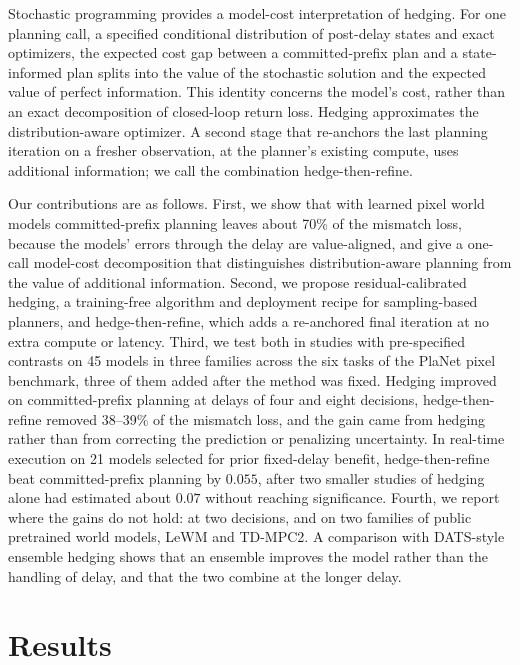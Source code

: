 \documentclass[aps,physrev,\manuscriptlayout,superscriptaddress,
  longbibliography,amsmath,amssymb]{revtex4-2}
\newcounter{algorithm}
\begin{document}
Stochastic programming provides a model-cost interpretation of hedging. For one planning call, a specified conditional distribution of post-delay states and exact optimizers, the expected cost gap between a committed-prefix plan and a state-informed plan splits into the value of the stochastic solution and the expected value of perfect information\cite{birge2011stochastic}. This identity concerns the model's cost, rather than an exact decomposition of closed-loop return loss. Hedging approximates the distribution-aware optimizer. A second stage that re-anchors the last planning iteration on a fresher observation, at the planner's existing compute, uses additional information; we call the combination hedge-then-refine.

Our contributions are as follows. First, we show that with learned pixel world models committed-prefix planning leaves about 70\% of the mismatch loss, because the models' errors through the delay are value-aligned, and give a one-call model-cost decomposition that distinguishes distribution-aware planning from the value of additional information. Second, we propose residual-calibrated hedging, a training-free algorithm and deployment recipe for sampling-based planners, and hedge-then-refine, which adds a re-anchored final iteration at no extra compute or latency. Third, we test both in studies with pre-specified contrasts on 45 models in three families across the six tasks of the PlaNet pixel benchmark, three of them added after the method was fixed. Hedging improved on committed-prefix planning at delays of four and eight decisions, hedge-then-refine removed 38--39\% of the mismatch loss, and the gain came from hedging rather than from correcting the prediction or penalizing uncertainty. In real-time execution on 21 models selected for prior fixed-delay benefit, hedge-then-refine beat committed-prefix planning by $0.055$, after two smaller studies of hedging alone had estimated about $0.07$ without reaching significance. Fourth, we report where the gains do not hold: at two decisions, and on two families of public pretrained world models, LeWM and TD-MPC2. A comparison with DATS-style ensemble hedging shows that an ensemble improves the model rather than the handling of delay, and that the two combine at the longer delay.

\section{Results}\label{sec:results}
\end{document}
